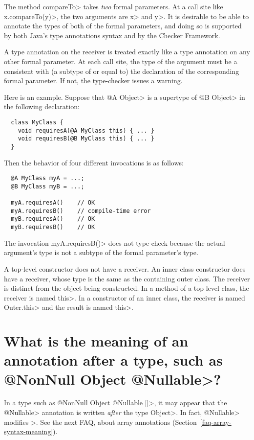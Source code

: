 The method \<compareTo> takes \emph{two} formal parameters.  At a call site
like \<x.compareTo(y)>, the two arguments are \<x> and \<y>.  It is
desirable to be able to annotate the types of both of the formal
parameters, and doing so is supported by both Java's type annotations
syntax and by the Checker Framework.

A type annotation on the receiver is treated exactly like a type annotation
on any other formal parameter.  At each call site, the type of the argument
must be a consistent with (a subtype of or equal to) the declaration of the
corresponding formal parameter.  If not, the type-checker issues a warning.

Here is an example.  Suppose that \<@A Object> is a supertype of \<@B
Object> in the following declaration:

\begin{Verbatim}
  class MyClass {
    void requiresA(@A MyClass this) { ... }
    void requiresB(@B MyClass this) { ... }
  }
\end{Verbatim}

\noindent
Then the behavior of four different invocations is as follows:

\begin{Verbatim}
  @A MyClass myA = ...;
  @B MyClass myB = ...;

  myA.requiresA()    // OK
  myA.requiresB()    // compile-time error
  myB.requiresA()    // OK
  myB.requiresB()    // OK
\end{Verbatim}

The invocation \<myA.requiresB()> does not type-check because the actual
argument's type is not a subtype of the formal parameter's type.

A top-level constructor does not have a receiver.  An inner class
constructor does have a receiver, whose type is the same as the containing
outer class.  The receiver is distinct from the object being constructed.
In a method of a top-level class, the receiver is named \<this>.  In a
constructor of an inner class, the receiver is named \<Outer.this> and the
result is named \<this>.


\section{What is the meaning of an annotation after a type, such as \<@NonNull Object @Nullable>?\label{faq-annotation-after-type}}

In a type such as \<@NonNull Object @Nullable []>, it may appear that the
\<@Nullable> annotation is written \emph{after} the type \<Object>.  In
fact, \<@Nullable> modifies \<[]>.  See the next FAQ, about array
annotations (Section~\ref{faq-array-syntax-meaning}).


